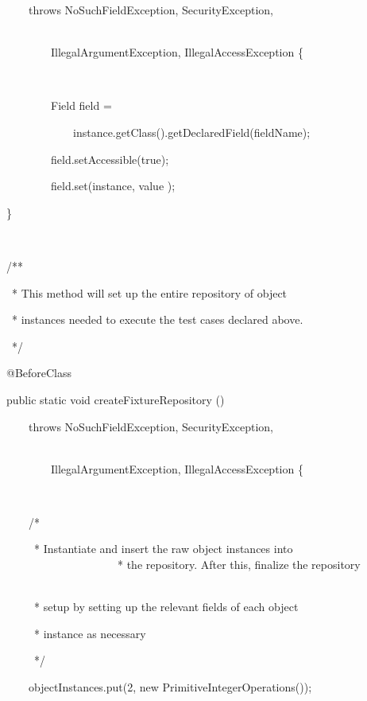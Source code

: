 \documentclass{article}
\newenvironment{tmindent}{\begin{tmparmod}{1.5em}{0pt}{0pt} }{\end{tmparmod}}
\newenvironment{tmparmod}[3]{\begin{list}{}{\setlength{\topsep}{0pt}\setlength{\leftmargin}{#1}\setlength{\rightmargin}{#2}\setlength{\parindent}{#3}\setlength{\listparindent}{\parindent}\setlength{\itemindent}{\parindent}\setlength{\parsep}{\parskip}} \item[]}{\end{list}}
\newenvironment{tmparsep}[1]{\begingroup\setlength{\parskip}{#1}}{\endgroup}
\begin{document}
\begin{example}
\begin{tmindent}
\begin{tmparsep}{0em}
      \ \ \ \ \ \ \ throws NoSuchFieldException, SecurityException, \ \ \ \ \
      \ \ \ \ \ \ \ \ \ \ \ \ \ \ \ \ \
      
      \ \ \ \ \ \ \ \ \ \ \ IllegalArgumentException, IllegalAccessException
      \{
      
      \ \ \ \ \ \ \
      
      \ \ \ \ \ \ \ \ \ \ \ Field field =
      
      \ \ \ \ \ \ \ \ \ \ \ \ \ \ \
      instance.getClass().getDeclaredField(fieldName);
      
      \ \ \ \ \ \ \ \ \ \ \ field.setAccessible(true);
      
      \ \ \ \ \ \ \ \ \ \ \ field.set(instance, value );
      
      \ \ \ \}
      
      \ \ \
      
      \ \ \ /**
      
      \ \ \ \ * This method will set up the entire repository of object \ \ \
      \ \ \ \ \
      
      \ \ \ \ * instances needed to execute the test cases declared above.
      
      \ \ \ \ */
      
      \ \ \ @BeforeClass
      
      \ \ \ public static void createFixtureRepository ()
      
      \ \ \ \ \ \ \ throws NoSuchFieldException, SecurityException, \ \ \ \ \
      \ \ \ \ \ \ \ \ \ \ \ \ \ \ \ \ \
      
      \ \ \ \ \ \ \ \ \ \ \ IllegalArgumentException, IllegalAccessException
      \{
      
      \ \ \ \ \ \ \
      
      \ \ \ \ \ \ \ /*
      
      \ \ \ \ \ \ \ \ * Instantiate and insert the raw object instances into
      \ \ \ \ \ \ \ \ \ \ \ \ \ \ \ \ \ \ \ \ \ \ \ * the repository. After
      this, finalize the repository \ \ \ \ \ \ \ \ \ \ \ \
      
      \ \ \ \ \ \ \ \ * setup by setting up the relevant fields of each
      object \ \ \ \ \ \ \ \ \
      
      \ \ \ \ \ \ \ \ * instance as necessary
      
      \ \ \ \ \ \ \ \ */
      
      \ \ \ \ \ \ \ objectInstances.put(2, new PrimitiveIntegerOperations());
      

\end{tmparsep}
\end{tmindent}
\end{example}
\end{document}
